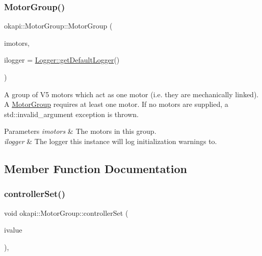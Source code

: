 \subsubsection{\texorpdfstring{MotorGroup()}{MotorGroup()}\hspace{0.1cm}{\footnotesize\ttfamily [2/2]}}
{\footnotesize\ttfamily okapi\+::\+Motor\+Group\+::\+Motor\+Group (\begin{DoxyParamCaption}\item[{const std\+::initializer\+\_\+list$<$ std\+::shared\+\_\+ptr$<$ \mbox{\hyperlink{classokapi_1_1AbstractMotor}{Abstract\+Motor}} $>$$>$ \&}]{imotors,  }\item[{const std\+::shared\+\_\+ptr$<$ \mbox{\hyperlink{classokapi_1_1Logger}{Logger}} $>$ \&}]{ilogger = {\ttfamily \mbox{\hyperlink{classokapi_1_1Logger_a5053cf778b4b55acba788a3797dc96d2}{Logger\+::get\+Default\+Logger}}()} }\end{DoxyParamCaption})}

A group of V5 motors which act as one motor (i.\+e. they are mechanically linked). A \mbox{\hyperlink{classokapi_1_1MotorGroup}{Motor\+Group}} requires at least one motor. If no motors are supplied, a {\ttfamily std\+::invalid\+\_\+argument} exception is thrown.


\begin{DoxyParams}{Parameters}
{\em imotors} & The motors in this group. \\
\hline
{\em ilogger} & The logger this instance will log initialization warnings to. \\
\hline
\end{DoxyParams}


\subsection{Member Function Documentation}
\mbox{\label{classokapi_1_1MotorGroup_a9da308795bb956d5f7f3f7885a727d8e}} 
\subsubsection{\texorpdfstring{controllerSet()}{controllerSet()}}
{\footnotesize\ttfamily void okapi\+::\+Motor\+Group\+::controller\+Set (\begin{DoxyParamCaption}\item[{double}]{ivalue }\end{DoxyParamCaption})\hspace{0.3cm}{\ttfamily [override]}, {\ttfamily [virtual]}}

